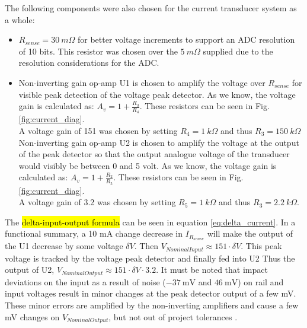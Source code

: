 The following components were also chosen for the current transducer system as a whole:
\begin{itemize}
    \item $R_{sense}=30 \ m\Omega$ for better voltage increments to support an ADC resolution of 10 bits. This resistor was chosen over the $5 \ m\Omega$ supplied due to the resolution considerations for the ADC.
    \item Non-inverting gain op-amp U1 is chosen to amplify the voltage over  $R_{sense}$ for visible peak detection of the voltage peak detector. As we know, the voltage gain is calculated as: $A_v=1+\frac{R_3}{R_4}$. These resistors can be seen in Fig. \ref{fig:current_diag}. \\A voltage gain of 151 was chosen by setting $R_4=1 \ k\Omega$ and thus $R_3=150 \ k\Omega$ \\Non-inverting gain op-amp U2 is chosen to amplify the voltage at the output of the peak detector so that the output analogue voltage of the transducer would visibly be between 0 and 5 volt. As we know, the voltage gain is calculated as: $A_v=1+\frac{R_2}{R_5}$. These resistors can be seen in Fig. \ref{fig:current_diag}. \\A voltage gain of 3.2 was chosen by setting $R_5=1 \ k\Omega$ and thus $R_3=2.2\ k\Omega$.
\end{itemize}

The \hl{delta-input-output formula} can be seen in equation \ref{eq:delta_current}. In a functional summary, a 10 mA change decrease in $I_{R_{sense}}$ will make the output of the U1 decrease by some voltage $\delta V$. Then $V_{Nominal Input} \approx151\cdot\delta V$. This peak voltage is tracked by the voltage peak detector and finally fed into U2 Thus the output of U2, $V_{Nominal Output} \approx151\cdot\delta V\cdot3.2$. It must be noted that impact deviations on the input as a result of noise ($\SI{-37}{\milli \volt}$ and $\SI{46}{\milli \volt}$) on rail and input voltages result in minor changes at the peak detector output of a few mV. These minor errors are amplified by the non-inverting amplifiers \cite{non-inverting} and cause a few mV changes on $V_{Nominal Output}$, but not out of project tolerances \cite{assignment_2}.

 

